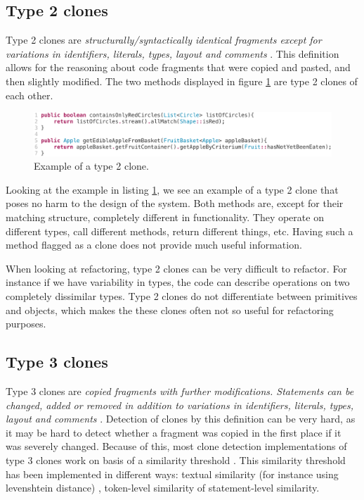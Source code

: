 \documentclass[a4paper]{article}
\begin{document}
\subsection{Type 2 clones}
Type 2 clones are \textit{structurally/syntactically identical fragments except for variations in identifiers, literals, types, layout and comments} \cite{roy2007survey}. This definition allows for the reasoning about code fragments that were copied and pasted, and then slightly modified. The two methods displayed in figure \ref{fig:type2} are type 2 clones of each other.

\begin{figure}[H]
  \includegraphics[width=1\columnwidth]{img/type2}
  \caption{Example of a type 2 clone.}
  \label{fig:type2}
\end{figure}

Looking at the example in listing \ref{fig:type2}, we see an example of a type 2 clone that poses no harm to the design of the system. Both methods are, except for their matching structure, completely different in functionality. They operate on different types, call different methods, return different things, etc. Having such a method flagged as a clone does not provide much useful information.

When looking at refactoring, type 2 clones can be very difficult to refactor. For instance if we have variability in types, the code can describe operations on two completely dissimilar types. Type 2 clones do not differentiate between primitives and objects, which makes the these clones often not so useful for refactoring purposes.

\subsection{Type 3 clones}
Type 3 clones are \textit{copied fragments with further modifications. Statements can be changed, added or removed in addition to variations in identifiers, literals, types, layout and comments} \cite{roy2007survey}. Detection of clones by this definition can be very hard, as it may be hard to detect whether a fragment was copied in the first place if it was severely changed. Because of this, most clone detection implementations of type 3 clones work on basis of a similarity threshold \cite{svajlenko2014evaluating, cordy2011nicad}. This similarity threshold has been implemented in different ways: textual similarity (for instance using levenshtein distance) \cite{lavoie2011automated}, token-level similarity of statement-level similarity.
\end{document}
